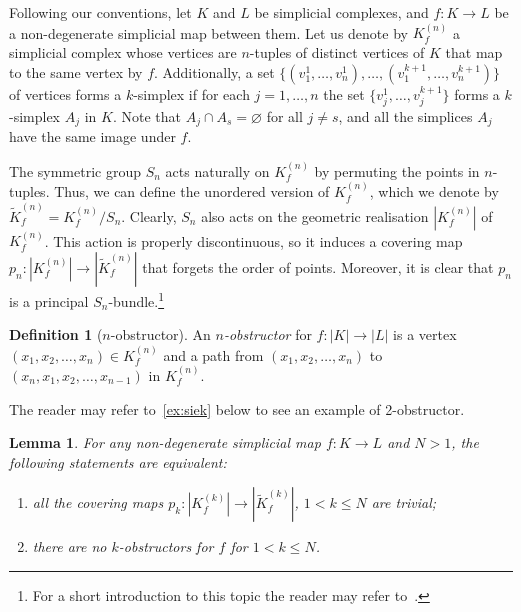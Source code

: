 \documentclass[a4paper,12pt,reqno,oneside]{amsart}
\theoremstyle{plain}
\newtheorem{lemma}{Lemma}
\theoremstyle{definition}
\newtheorem*{definition}{Definition}
\theoremstyle{plain}
\newcommand{\from}{\colon}
\newcommand{\wt}[1]{\widetilde{#1}}
\begin{document}
Following our conventions, let $K$ and $L$ be simplicial complexes, and $f \from K \to L$ be a
non-degenerate simplicial map between them. Let us denote by $K^{(n)}_f$ a simplicial complex whose
vertices are $n$-tuples of distinct vertices of $K$ that map to the same vertex by $f$.
Additionally, a set $\{(v_1^1, \dots, v_n^1), \dots, (v_1^{k+1}, \dots, v_n^{k+1})\}$ of vertices
forms a $k$-simplex if for each $j = 1, \dots, n$ the set $\{v_j^1, \dots, v_j^{k+1}\}$ forms a
$k$-simplex $A_j$ in $K$. Note that $A_j \cap A_s = \varnothing$ for all $j \neq s$, and all the
simplices $A_j$ have the same image under $f$.

The symmetric group $S_n$ acts naturally on $K^{(n)}_f$ by permuting the points in $n$-tuples. Thus,
we can define the unordered version of $K^{(n)}_f$, which we denote by
$\wt{K}^{(n)}_f = K^{(n)}_f / S_n$. Clearly, $S_n$ also acts on the geometric realisation
$|K^{(n)}_f|$ of $K^{(n)}_f$. This action is properly discontinuous, so it induces a covering map
$p_n \from |K^{(n)}_f| \to |\wt{K}^{(n)}_f|$ that forgets the order of points. Moreover, it is
clear that $p_n$ is a principal $S_n$-bundle.\footnote{For a short introduction to this topic the
  reader may refer to~\cite{principal_bundles}.}

\begin{definition}[$n$-obstructor]
  An \emph{$n$-obstructor} for $f \from |K| \to |L|$ is a vertex
  $(x_1, x_2, \dots, x_n) \in K^{(n)}_f$ and a path from $(x_1, x_2, \dots, x_n)$ to
  $(x_n, x_1, x_2, \dots, x_{n-1})$ in $K^{(n)}_f$.
\end{definition}

The reader may refer to~\cref{ex:siek} below to see an example of 2-obstructor.

\begin{lemma}\label{lemma:equiv_obstr}
  For any non-degenerate simplicial map $f \from K \to L$ and $N > 1$, the following statements are equivalent:
  \begin{enumerate}
  \item all the covering maps $p_k \from |K^{(k)}_f| \to |\wt{K}^{(k)}_f|$, $1 < k \leq N$ are trivial;
  \item there are no $k$-obstructors for $f$ for $1 < k \leq N$.
  \end{enumerate}
\end{lemma}
\end{document}
